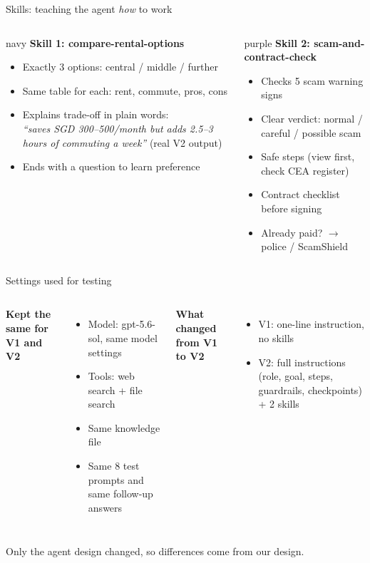 \documentclass[aspectratio=169,11pt]{beamer}
\begin{document}
\begin{frame}{Skills: teaching the agent \emph{how} to work}
\begin{columns}[T]
\begin{card}{navy}
\textbf{Skill 1: compare-rental-options}\\[3pt]
\footnotesize
\begin{itemize}
  \item Exactly 3 options: central / middle / further
  \item Same table for each: rent, commute, pros, cons
  \item Explains trade-off in plain words:\\
  \emph{``saves SGD 300--500/month but adds 2.5--3 hours of commuting a week''} (real V2 output)
  \item Ends with a question to learn preference
\end{itemize}
\end{card}
\begin{card}{purple}
\textbf{Skill 2: scam-and-contract-check}\\[3pt]
\footnotesize
\begin{itemize}
  \item Checks 5 scam warning signs
  \item Clear verdict: normal / careful / possible scam
  \item Safe steps (view first, check CEA register)
  \item Contract checklist before signing
  \item Already paid? $\rightarrow$ police / ScamShield
\end{itemize}
\end{card}
\end{columns}
\end{frame}

\begin{frame}{Settings used for testing}
\begin{columns}[T]
\textbf{Kept the same for V1 and V2}
\begin{itemize}
  \item Model: gpt-5.6-sol, same model settings
  \item Tools: web search + file search
  \item Same knowledge file
  \item Same 8 test prompts and same follow-up answers
\end{itemize}
\textbf{What changed from V1 to V2}
\begin{itemize}
  \item V1: one-line instruction, no skills
  \item V2: full instructions (role, goal, steps, guardrails, checkpoints) + 2 skills
\end{itemize}
\end{columns}
\vspace{10pt}
\centering
\alert{Only the agent design changed, so differences come from our design.}
\end{frame}
\end{document}
